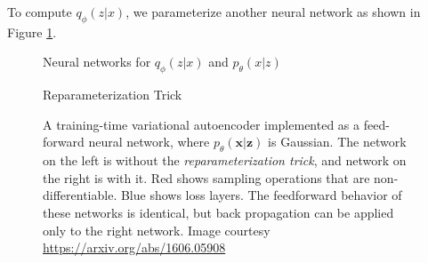 \documentclass[11pt, oneside]{article}   	%
\begin{document}
\bigskip
\noindent
To compute $q_{\phi}(z|x)$, we parameterize another neural network as shown in Figure \ref{fig:vae_parameter}.


\begin{figure}
\caption{Neural networks for $q_{\phi}(z|x)$ and $p_{\theta}(x|z)$}
\label{fig:vae_parameter}
\end{figure}

\begin{figure}
\caption{Reparameterization Trick}
\label{fig:vae_reparam_trick}
\end{figure}

\begin{figure}
\caption{A training-time variational autoencoder implemented as a feed-forward neural network, where $p_{\theta}(\mathbf{x}|\mathbf{z})$ is Gaussian. The network on the left is without the \emph{reparameterization trick}, and network on the right is with it. Red shows sampling operations that are non-differentiable. Blue shows loss layers. The feedforward behavior of these networks is identical, but back propagation can be applied only to the right network. Image courtesy \url{https://arxiv.org/abs/1606.05908}}
\label{fig:training_time_vae}
\end{figure}
\end{document}

